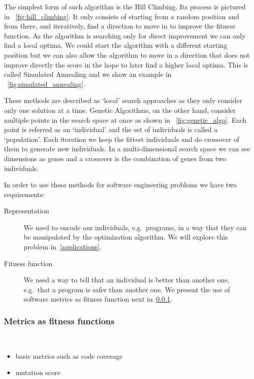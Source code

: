 \documentclass[11pt]{sdm}
\newcommand{\todo}[1]{\colorbox{Red!75}{\textcolor{white}{\textbf{TODO\ifx&#1&\else: #1\fi}}}}
\begin{document}
The simplest form of such algorithm is the Hill Climbing.
Its process is pictured in \figurename~\ref{fig:hill_climbing}.
It only consists of starting from a random position and from there, and iteratively, find a direction to move in to improve the fitness function.
As the algorithm is searching only for direct improvement we can only find a local optima.
We could start the algorithm with a different starting position but we can also allow the algorithm to move in a direction that does not improve directly the score in the hope to later find a higher local optima.
This is called Simulated Annealing and we show an example in \figurename~\ref{fig:simulated_annealing}.

These methods are described as `local' search approaches as they only consider only one solution at a time.
Genetic Algorithms, on the other hand, consider multiple points in the search space at once as shown in \figurename~\ref{fig:genetic_algo}.
Each point is referred as an `individual' and the set of individuals is called a `population'.
Each iteration we keep the fittest individuals and do crossover of them to generate new individuals.
In a multi-dimensional search space we can see dimensions as genes and a crossover is the combination of genes from two individuals.

In order to use these methods for software engineering problems we have two requirements:
\begin{description}
  \item[Representation] We need to encode our individuals, e.g.\ programs, in a way that they can be manipulated by the optimization algorithm. We will explore this problem in~\ref{applications}.
  \item[Fitness function] We need a way to tell that an individual is better than another one, e.g.\ that a program is safer than another one. We present the use of software metrics as fitness function next in~\ref{fitness_func}.
\end{description}

\subsubsection{Metrics as fitness functions}
\label{fitness_func}
\todo{}

\begin{itemize}
  \item basic metrics such as code coverage
  \item mutation score
\end{itemize}
\end{document}
